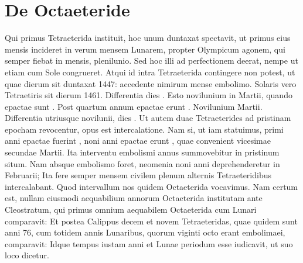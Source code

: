\section{De Octaeteride}
Qui primus Tetraeterida instituit, hoc unum duntaxat spectavit,
ut primus eius mensis incideret in verum mensem Lunarem,
propter Olympicum agonem, qui semper fiebat in 
mensis, plenilunio.
Sed hoc illi ad perfectionem deerat, nempe ut etiam
cum Sole congrueret.
Atqui id intra Tetraeterida contingere non potest,
ut quae dierum sit duntaxat 1447: accedente nimirum mense embolimo.
Solaris vero Tetraetiris sit dierum 1461.
Differentia dies .
Esto novilunium in  Martii, quando epactae sunt .
Post quartum
annum epactae erunt .
Novilunium  Martii.
Differentia
utriusque novilunii, dies .
Ut autem duae Tetraeterides ad pristinam
epocham revocentur, opus est intercalatione.
Nam si, ut iam
statuimus, primi anni epactae fuerint ,
 noni anni epactae erunt ,
quae convenient vicesimae secundae Martii.
Ita interventu embolismi
annus summovebitur in pristinum situm.
Nam absque embolismo
foret, neomenia noni anni deprehenderetur in  Februarii;
Ita fere
semper mensem civilem plenum alternis Tetraeteridibus intercalabant.
Quod intervallum nos quidem Octaeterida vocavimus.
Nam
certum est, nullam eiusmodi aequabilium annorum Octaeterida institutam
ante Cleostratum, qui primus omnium aequabilem Octaeterida
cum Lunari comparavit:
Et postea Calippus decem et novem
Tetraeteridas, quae quidem sunt anni 76, cum totidem annis Lunaribus,
quorum viginti octo erant embolimaei, comparavit:
Idque
tempus iustam anni et Lunae periodum esse iudicavit, ut suo loco dicetur.
